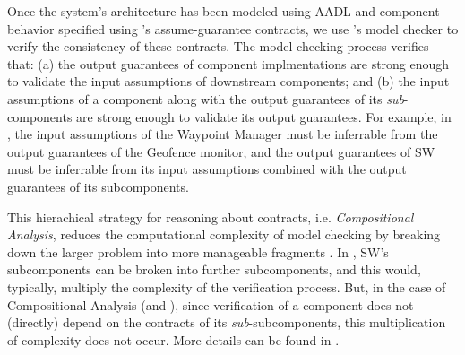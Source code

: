
Once the system's architecture has been modeled using AADL
and component behavior specified using \agree's assume-guarantee contracts,
we use \agree's model checker to verify the consistency of these contracts.
The model checking process verifies that:
(a) the output guarantees of component implmentations are strong enough to
validate the input assumptions of downstream components; and 
(b) the input assumptions of a component along with the output guarantees of its \emph{sub}-components
are strong enough to validate its output guarantees.
For example, in ,
the input assumptions of the Waypoint Manager must be inferrable from
the output guarantees of the Geofence monitor, 
and the output guarantees of SW must be inferrable from
its input assumptions combined with the output guarantees of its subcomponents.

This hierachical strategy for reasoning about contracts,
i.e. \emph{Compositional Analysis},
reduces the computational complexity of model checking
by breaking down the larger problem into more manageable fragments \cite{compositional-analysis-agree}.
In , SW's subcomponents can be broken into further subcomponents,
and this would, typically, multiply the complexity of the verification process.
But, in the case of Compositional Analysis (and \agree),
since verification of a component does not (directly) depend on the contracts of its \emph{sub}-subcomponents,
this multiplication of complexity does not occur.
More details can be found in \cite{case-models-2021}.
